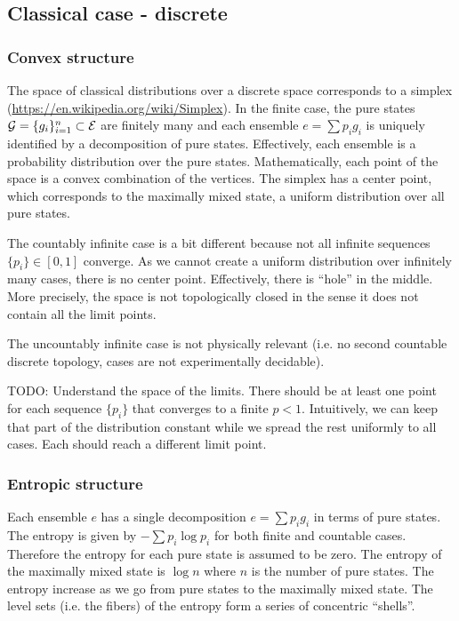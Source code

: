 \subsection{Classical case - discrete}

\subsubsection{Convex structure}

The space of classical distributions over a discrete space corresponds to a simplex (\url{https://en.wikipedia.org/wiki/Simplex}). In the finite case, the pure states $\mathcal{G} = \{g_i\}_{i=1}^{n} \subset \mathcal{E}$ are finitely many and each ensemble $e = \sum p_i g_i$ is uniquely identified by a decomposition of pure states. Effectively, each ensemble is a probability distribution over the pure states. Mathematically, each point of the space is a convex combination of the vertices. The simplex has a center point, which corresponds to the maximally mixed state, a uniform distribution over all pure states.

The countably infinite case is a bit different because not all infinite sequences $\{p_i\} \in [0,1]$ converge. As we cannot create a uniform distribution over infinitely many cases, there is no center point. Effectively, there is ``hole'' in the middle. More precisely, the space is not topologically closed in the sense it does not contain all the limit points.

The uncountably infinite case is not physically relevant (i.e. no second countable discrete topology, cases are not experimentally decidable).

TODO: Understand the space of the limits. There should be at least one point for each sequence $\{p_i\}$ that converges to a finite $p < 1$. Intuitively, we can keep that part of the distribution constant while we spread the rest uniformly to all cases. Each should reach a different limit point.

\subsubsection{Entropic structure}

Each ensemble $e$ has a single decomposition $e = \sum p_i g_i$ in terms of pure states. The entropy is given by $-\sum p_i \log p_i$ for both finite and countable cases. Therefore the entropy for each pure state is assumed to be zero. The entropy of the maximally mixed state is $\log n$ where $n$ is the number of pure states. The entropy increase as we go from pure states to the maximally mixed state. The level sets (i.e. the fibers) of the entropy form a series of concentric ``shells''.

